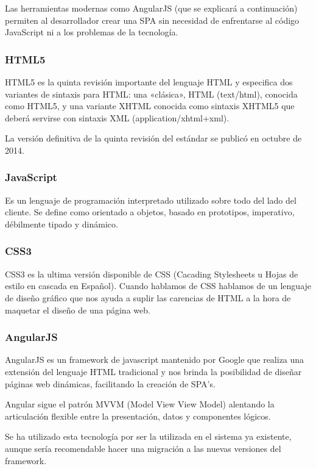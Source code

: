 Las herramientas modernas como AngularJS (que se explicará a continuación) permiten al desarrollador crear una SPA sin necesidad de enfrentarse al código JavaScript ni a los problemas de la tecnología. 

\subsubsection{HTML5}

HTML5 es la quinta revisión importante del lenguaje HTML y especifica dos variantes de sintaxis para HTML: una «clásica», HTML (text/html), conocida como HTML5, y una variante XHTML conocida como sintaxis XHTML5 que deberá servirse con sintaxis XML (application/xhtml+xml).

La versión definitiva de la quinta revisión del estándar se publicó en octubre de 2014.

\subsubsection{JavaScript}

Es un lenguaje de programación interpretado utilizado sobre todo del lado del cliente. Se define como orientado a objetos, basado en prototipos, imperativo, débilmente tipado y dinámico.

\subsubsection{CSS3}

CSS3 es la ultima versión disponible de CSS (Cacading Stylesheets u Hojas de estilo en cascada en Español). Cuando hablamos de CSS hablamos de un lenguaje de diseño gráfico que nos ayuda a suplir las carencias de HTML a la hora de maquetar el diseño de una página web.

\subsubsection{AngularJS}

AngularJS es un framework de javascript mantenido por Google que realiza una extensión del lenguaje HTML tradicional y nos brinda la posibilidad de diseñar páginas web dinámicas, facilitando la creación de SPA's.

Angular sigue el patrón MVVM (Model View View Model) alentando la articulación flexible entre la presentación, datos y componentes lógicos.

Se ha utilizado esta tecnología por ser la utilizada en el sistema ya existente, aunque sería recomendable hacer una migración a las nuevas versiones del framework.

